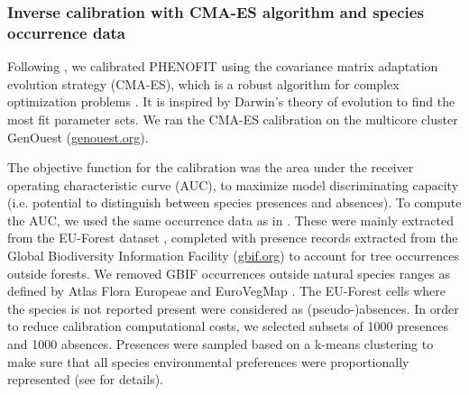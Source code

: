 \documentclass[preprint,12pt,authoryear]{elsarticle}
\begin{document}
\subsubsection{Inverse calibration with CMA-ES algorithm and species occurrence data}

Following \citet{VanderMeersch2023}, we calibrated PHENOFIT using the covariance matrix adaptation evolution strategy (CMA-ES), which  is a robust algorithm for complex optimization problems \citep{Hansen2001}. It is inspired by Darwin's theory of evolution to find the most fit parameter sets. We ran the CMA-ES calibration on the multicore cluster GenOuest (\url{genouest.org}).

The objective function for the calibration was the area under the receiver operating characteristic curve (AUC), to maximize model discriminating capacity (i.e. potential to distinguish between species presences and absences). To compute the AUC, we used the same occurrence data as in \citet{VanderMeersch2023}. These were mainly extracted from the EU-Forest dataset \citep{Mauri2017}, completed with presence records extracted from the Global Biodiversity Information Facility (\url{gbif.org}) to account for tree occurrences outside forests. We removed GBIF occurrences outside natural species ranges as defined by Atlas Flora Europeae \citep{AFE2005} and EuroVegMap \citep{EVM2003}. The EU-Forest cells where the species is not reported present were considered as (pseudo-)absences. In order to reduce calibration computational costs, we selected subsets of 1000 presences and 1000 absences. Presences were sampled based on a k-means clustering to make sure that all species environmental preferences were proportionally represented (see \citet{VanderMeersch2023} for details). 
\end{document}
